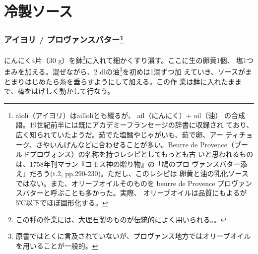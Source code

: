 \hypertarget{ux51b7ux88fdux30bdux30fcux30b9}{%
\section{冷製ソース}\label{ux51b7ux88fdux30bdux30fcux30b9}}


\begin{recette}
\hypertarget{sauce-aioli}{%
\subsubsection[アイヨリ / プロヴァンスバター]{\texorpdfstring{アイヨリ /
プロヴァンスバター\footnote{aïoli（アイヨリ）はailloliとも綴るが、
  ail（にんにく）+ oil（油）
  の合成語。19世紀前半には既にアカデミーフランセージの辞書に収録され
  ており、広く知られていたようだ。茹でた塩鱈やじゃがいも、茹で卵、アー
  ティチョーク、さやいんげんなどに合わせることが多い。Beurre de
  Provence（ブールドプロヴォンス）の名称を持つレシピとしてもっとも古
  いと思われるものは、1758年刊マラン『コモス神の贈り物』の「鳩のプロ
  ヴァンスバター添え」だろう(t.2, pp.290-230)。ただし、このレシピは
  卵黄と油の乳化ソースではない。また、オリーブオイルそのものを beurre de
  Provence プロヴァンスバターと呼ぶことも多かった。実際、
  オリーブオイルは品質にもよるが5℃以下でほぼ固形化する。}}{アイヨリ / プロヴァンスバター}}\label{sauce-aioli}}



にんにく4片（30 g）を鉢\footnote{この種の作業には、大理石製のものが伝統的によく用いられる。。}に入れて細かくすり潰す。ここに生の卵黄1個、
塩1つまみを加える。混ぜながら、2\undemi{} dlの油\footnote{原書ではとくに言及されていないが、プロヴァンス地方ではオリーブオイルを用いることが一般的。}を初めは1滴ずつ加
えていき、ソースがまとまりはじめたら糸を垂らすようにして加える。この作
業は鉢に入れたままで、棒をはげしく動かして行なう。


\end{recette}
